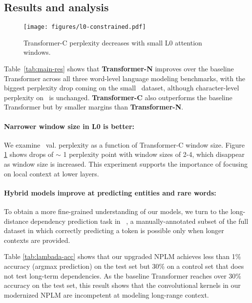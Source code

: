 \documentclass[11pt]{article}
\begin{document}
 \subsection{Results and analysis}

\begin{figure} [t]
\centering
     \texttt{[image: figures/l0-constrained.pdf]}
    \caption{ Transformer-C perplexity decreases with small L0 attention windows.
    }
    \label{fig:short-context-l0-constrain-1}
\end{figure}

Table~\ref{tab:main-res} shows that \textbf{Transformer-N} improves over the baseline Transformer across all three word-level language modeling benchmarks, with the biggest perplexity drop coming on the small \wttwo\ dataset, although character-level perplexity on \enwik\ is unchanged.  \textbf{Transformer-C} also outperforms the baseline Transformer but by smaller margins than \textbf{Transformer-N}. 

\paragraph{Narrower window size in L0 is better:}
We examine \wtthree\ val. perplexity as a function of Transformer-C window size. 
Figure \ref{fig:short-context-l0-constrain-1} shows drops of $\sim$ 1 perplexity point with window sizes of 2-4, which disappear as window size is increased. This experiment supports the importance of focusing on local context at lower layers. 


\paragraph{Hybrid models improve at predicting entities and rare words:}
To obtain a more fine-grained understanding of our models, we turn to the long-distance dependency prediction task in \lambada ~\cite{paperno-etal-2016-lambada}, a manually-annotated subset of the full dataset in which correctly predicting a token is possible only when longer contexts are provided.

Table \ref{tab:lambada-acc} shows that our upgraded NPLM achieves less than 1\% accuracy (argmax prediction) on the test set but 30\% on a control set that does not test long-term dependencies. As the baseline Transformer reaches over 30\% accuracy on the test set, this result shows that the convolutional kernels in our modernized NPLM are incompetent at modeling long-range context. 
\end{document}
